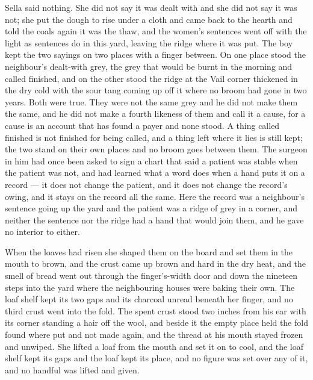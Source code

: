 Sella said nothing. She did not say it was dealt with and she did not say it was not; she put the dough to rise under a cloth and came back to the hearth and told the coals again it was the thaw, and the women's sentences went off with the light as sentences do in this yard, leaving the ridge where it was put. The boy kept the two sayings on two places with a finger between. On one place stood the neighbour's dealt-with grey, the grey that would be burnt in the morning and called finished, and on the other stood the ridge at the Vail corner thickened in the dry cold with the sour tang coming up off it where no broom had gone in two years. Both were true. They were not the same grey and he did not make them the same, and he did not make a fourth likeness of them and call it a cause, for a cause is an account that has found a payer and none stood. A thing called finished is not finished for being called, and a thing left where it lies is still kept; the two stand on their own places and no broom goes between them. The surgeon in him had once been asked to sign a chart that said a patient was stable when the patient was not, and had learned what a word does when a hand puts it on a record --- it does not change the patient, and it does not change the record's owing, and it stays on the record all the same. Here the record was a neighbour's sentence going up the yard and the patient was a ridge of grey in a corner, and neither the sentence nor the ridge had a hand that would join them, and he gave no interior to either.

When the loaves had risen she shaped them on the board and set them in the mouth to brown, and the crust came up brown and hard in the dry heat, and the smell of bread went out through the finger's-width door and down the nineteen steps into the yard where the neighbouring houses were baking their own. The loaf shelf kept its two gaps and its charcoal unread beneath her finger, and no third crust went into the fold. The spent crust stood two inches from his ear with its corner standing a hair off the wool, and beside it the empty place held the fold found where put and not made again, and the thread at his mouth stayed frozen and unwiped. She lifted a loaf from the mouth and set it on  to cool, and the loaf shelf kept its gaps and the loaf kept its place, and no figure was set over any of it, and no handful was lifted and given.

